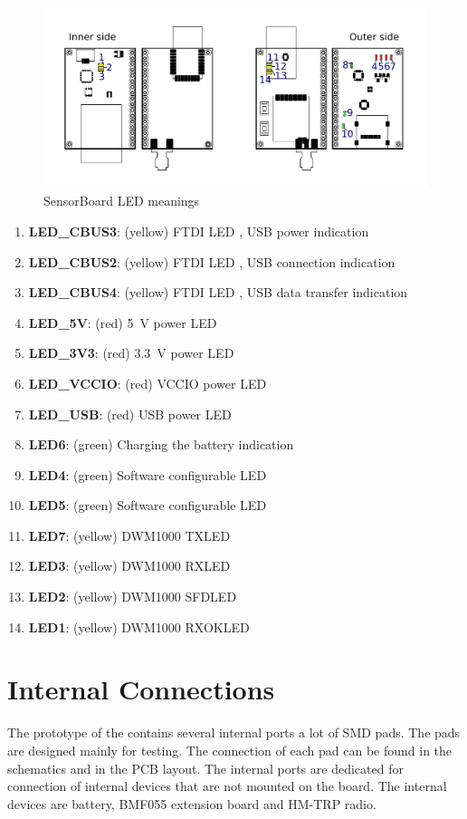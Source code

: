\begin{figure}[H]
	\centering
	\includegraphics[scale=1]{img/LEDmeanings.pdf}
	\caption{SensorBoard LED meanings}
	\label{fig:LEDmeaning}
\end{figure}

\begin{enumerate}
	\setlength\itemsep{0.2em}
	\item \textbf{LED\_CBUS3}: (yellow) FTDI LED \cite{ftdichip:FT232R}, \ac{USB} power indication
	\item \textbf{LED\_CBUS2}: (yellow) FTDI LED \cite{ftdichip:FT232R}, \ac{USB} connection indication
	\item \textbf{LED\_CBUS4}: (yellow) FTDI LED \cite{ftdichip:FT232R}, \ac{USB} data transfer indication
	\item \textbf{LED\_5V}: (red) \SI{5}{V} power LED
	\item \textbf{LED\_3V3}: (red) \SI{3.3}{V} power LED
	\item \textbf{LED\_VCCIO}: (red) VCCIO power LED
	\item \textbf{LED\_USB}: (red) \ac{USB} power LED
	\item \textbf{LED6}: (green) Charging the battery indication
	\item \textbf{LED4}: (green) Software configurable LED
	\item \textbf{LED5}: (green) Software configurable LED
	\item \textbf{LED7}: (yellow) DWM1000 TXLED \cite{decawave:DWM1000}
	\item \textbf{LED3}: (yellow) DWM1000 RXLED \cite{decawave:DWM1000}
	\item \textbf{LED2}: (yellow) DWM1000 SFDLED \cite{decawave:DWM1000}
	\item \textbf{LED1}: (yellow) DWM1000 RXOKLED \cite{decawave:DWM1000}
\end{enumerate}

\section{Internal Connections}
The prototype of the  contains several internal ports a lot of \ac{SMD} pads. The pads are designed mainly for testing. The connection of each pad can be found in the schematics and in the \ac{PCB} layout. The internal ports are dedicated for connection of internal devices that are not mounted on the board. The internal devices are battery, BMF055 \cite{bosch:BMF055} extension board and HM-TRP \cite{HM-TRP} radio.


